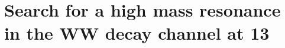 \section{Search for a high mass resonance in the WW decay channel at 13\TeV}
\label{sec:HighMass13TeV}
